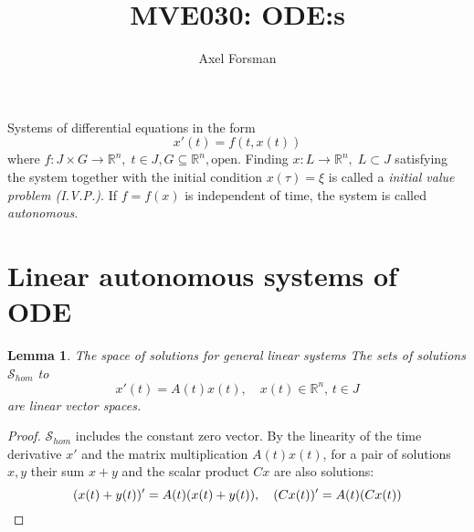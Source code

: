 \documentclass{article}
\title{MVE030: ODE:s}
\author{Axel Forsman}
\newtheorem{lemma}[theorem]{Lemma}
\begin{document}
\maketitle

Systems of differential equations in the form
$$ x'(t) = f(t, x(t)) $$
where $f : J \times G \to \mathbb R^n, \; t \in J, G \subseteq \mathbb R^n, \text{open}$.
Finding $x : L \to \mathbb R^n, \; L \subset J$ satisfying the system
together with the initial condition $x(\tau) = \xi$ is called a
\emph{initial value problem (I.V.P.)}.
If $f = f(x)$ is independent of time, the system is called \emph{autonomous}.

\section{Linear autonomous systems of ODE}

\begin{lemma}{The space of solutions for general linear systems}
	The sets of solutions $\mathcal S_{hom}$ to
	$$ x'(t) = A(t) x(t), \quad x(t) \in \mathbb R^n, \, t \in J $$
	are linear vector spaces.
\end{lemma}
\begin{proof}
	$\mathcal S_{hom}$ includes the constant zero vector.
	By the linearity of the time derivative $x'$ and the matrix multiplication $A(t)x(t)$,
	for a pair of solutions $x, y$ their sum $x + y$ and the scalar product $Cx$ are also solutions:
	$$ (x(t) + y(t))' = A(t) (x(t) + y(t)), \quad (Cx(t))' = A(t)(Cx(t)) \qedhere $$
\end{proof}
\end{document}
